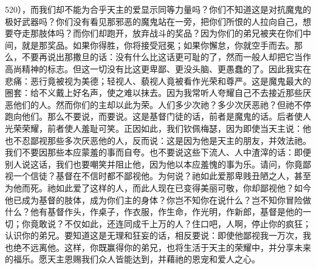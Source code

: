 520），而我们却不能为合乎天主的爱显示同等力量吗？你们不知道这是对抗魔鬼的极好武器吗？你们没有看见那邪恶的魔鬼站在一旁，把你们所恨的人拉向自己，想要夺走那肢体吗？而你们却跑开，放弃战斗的奖品？因为你们的弟兄被夹在你们中间，就是那奖品。如果你得胜，你将接受冠冕；如果你懈怠，你就空手而去。那么，不要再说出那撒旦的话：没有什么比这话更可耻的了，然而一般人却把它当作高尚精神的标志。但这一切没有比这更卑鄙、更没头脑、更愚蠢的了。因此我实在悲痛：恶行竟被视为美德；轻视人、藐视人竟被看作光荣和尊严。这是魔鬼最大的圈套：给不义戴上好名声，使之难以抹去。因为我常听人夸耀自己不去接近那些厌恶他们的人。然而你们的主却以此为荣。人们多少次祂？多少次厌恶祂？但祂不停跑向他们。那么不要说，而要说。这是基督门徒的话，前者是魔鬼的话。后者使人光荣荣耀，前者使人羞耻可笑。正因如此，我们钦佩梅瑟，因为即使当天主说：他也不忍鄙视那些多次厌恶他的人，反而说：这是因为他是天主的朋友，并效法祂。我们不要因那些本应蒙羞的事而自夸。也不要说这些下流人、人中渣滓的话：即便别人说这话，我们也要嘲笑并阻止他，因为他以本应羞愧的事为乐。请问，你竟鄙视一个信徒？基督在不信时都不鄙视他。为何说？祂如此爱那卑贱丑陋之人，甚至为他而死。祂如此爱了这样的人，而此人现在已变得美丽可敬，你却鄙视他？如今他已成为基督的肢体，成为你们主的身体？你岂不知你在说什么？岂不知你冒险做什么？他有基督作头，作桌子，作衣服，作生命，作光明，作新郎，基督是他的一切；你竟敢说？不仅如此，还连同成千上万的人？住口吧，人啊，停止你的疯狂；认识你的弟兄。要知道这是无理和狂妄的话，相反要说：即使他鄙视我一万次，我也绝不远离他。这样，你既赢得你的弟兄，也将生活于天主的荣耀中，并分享未来的福乐。愿天主恩赐我们众人皆能达到，并藉祂的恩宠和爱人之心。\par



\section{}

